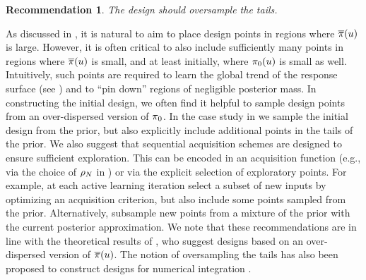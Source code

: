 \documentclass[12pt]{article}
\newtheorem{rec}{Recommendation}
\begin{document}
\begin{rec} \label{rec:oversample-tails}
The design should oversample the tails.
\end{rec}
As discussed in , it is natural to aim to place design points in regions
where $\postDensNorm(\Par)$ is large. However, it is often critical to also include sufficiently many
points in regions where $\postDensNorm(\Par)$ is small, and at least initially, where 
$\priorDens(\Par)$ is small as well. Intuitively, such points are required to 
learn the global trend of the response surface (see ) and to ``pin down''
regions of negligible posterior mass. In constructing the initial design, we often find it helpful
to sample design points from an over-dispersed version of $\priorDens$. In the 
case study in  we sample the initial design from the prior, but also
explicitly include additional points in the tails of the prior. We also suggest that sequential
acquisition schemes are designed to ensure sufficient exploration. This can be encoded
in an acquisition function (e.g., via the choice of $\weightDens[\Ndesign]$ in )
or via the explicit selection of exploratory points.  
For example, at each active learning iteration \citet{gp_surrogates_random_exploration} 
select a subset of new inputs by optimizing an acquisition criterion, but also include some 
points sampled from the prior. Alternatively, \citet{FerEmulation} subsample new points from a
mixture of the prior with the current posterior approximation. We note that 
these recommendations are in line with the theoretical results of \citet{StuartTeck2}, who 
suggest designs based on an over-dispersed version of $\postDensNorm(\Par)$.
The notion of oversampling the tails has also been proposed to construct designs
for numerical integration \citep{briol2017sampling}.
\end{document}
